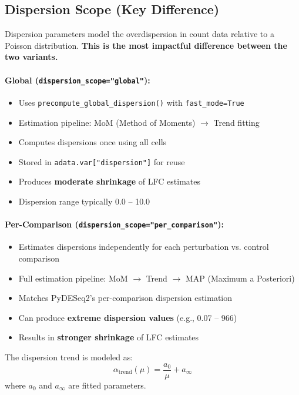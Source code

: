 \documentclass{article}
\begin{document}
\subsection{Dispersion Scope (Key Difference)}

Dispersion parameters model the overdispersion in count data relative to a Poisson distribution. \textbf{This is the most impactful difference between the two variants.}

\paragraph{Global (\texttt{dispersion\_scope="global"}):}
\begin{itemize}
    \item Uses \texttt{precompute\_global\_dispersion()} with \texttt{fast\_mode=True}
    \item Estimation pipeline: MoM (Method of Moments) $\rightarrow$ Trend fitting
    \item Computes dispersions once using all cells
    \item Stored in \texttt{adata.var["dispersion"]} for reuse
    \item Produces \textbf{moderate shrinkage} of LFC estimates
    \item Dispersion range typically 0.0 -- 10.0
\end{itemize}

\paragraph{Per-Comparison (\texttt{dispersion\_scope="per\_comparison"}):}
\begin{itemize}
    \item Estimates dispersions independently for each perturbation vs. control comparison
    \item Full estimation pipeline: MoM $\rightarrow$ Trend $\rightarrow$ MAP (Maximum a Posteriori)
    \item Matches PyDESeq2's per-comparison dispersion estimation
    \item Can produce \textbf{extreme dispersion values} (e.g., 0.07 -- 966)
    \item Results in \textbf{stronger shrinkage} of LFC estimates
\end{itemize}

The dispersion trend is modeled as:
\begin{equation}
    \alpha_{\text{trend}}(\mu) = \frac{a_0}{\mu} + a_\infty
\end{equation}
where $a_0$ and $a_\infty$ are fitted parameters.
\end{document}
